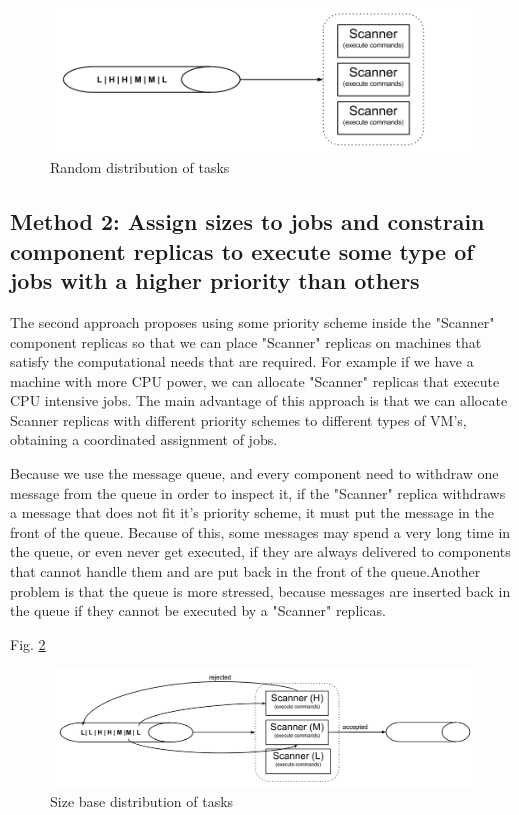 \begin{figure}[ht]
\centering
\includegraphics[width=\linewidth]{./img/1_NaturalLoadBalancing.png}
\caption{Random distribution of tasks}
\label{fig:randomDIstributionsOfTasks}
\end{figure}

\subsection{Method 2: Assign sizes to jobs and constrain component replicas to execute some type of jobs with a higher priority than others}
The second approach proposes using some priority scheme inside the "Scanner" component replicas so that we can place "Scanner" replicas on machines that satisfy the computational needs that are required. For example if we have a machine with more CPU power, we can allocate "Scanner" replicas that execute CPU intensive jobs. The main advantage of this approach is that we can allocate Scanner replicas with different priority schemes to different types of VM's, obtaining a coordinated assignment of jobs. 

Because we use the message queue, and every component need to withdraw one message from the queue in order to inspect it, if the "Scanner" replica withdraws a message that does not fit it's priority scheme, it must put the message in the front of the queue. Because of this, some messages may spend a very long time in the queue, or even never get executed, if they are always delivered to components that cannot handle them and are put back in the front of the queue.Another problem is that the queue is more stressed, because messages are inserted back in the queue if they cannot be executed by a "Scanner" replicas.


Fig. \ref{fig:sizeBaseDistributionOftasks}

\begin{figure}[ht]
\centering
\includegraphics[width=\linewidth]{./img/2_PriorityLoadBalancing.png}
\caption{Size base distribution of tasks}
\label{fig:sizeBaseDistributionOftasks}
\end{figure}



